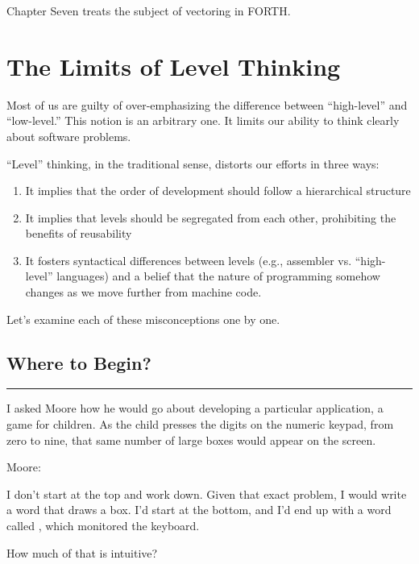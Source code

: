 Chapter Seven treats the subject of vectoring in FORTH.

\section{The Limits of Level Thinking}

Most of us are guilty of over-emphasizing the difference between
``high-level'' and ``low-level.'' This notion is an arbitrary one. It
limits our ability to think clearly about software problems.

``Level'' thinking, in the traditional sense, distorts our efforts in
three ways:

\begin{enumerate}
	\item It implies that the order of development should follow a hierarchical structure

	\item It implies that levels should be segregated from each other, prohibiting the
benefits of reusability

	\item It fosters syntactical differences between levels (e.g., assembler vs. ``high-level''
languages) and a belief that the nature of programming somehow
changes as we move further from machine code.
\end{enumerate}

Let's examine each of these misconceptions one by one.

\pagebreak\subsection{Where to Begin?}

\hrule height 1pt\vspace{2ex}

I asked Moore how he would go about developing a particular
application, a game for children. As the child presses the digits on
the numeric keypad, from zero to nine, that same number of large boxes
would appear on the screen.

	Moore:

\begin{tfquot}
	I don't start at the top and work down. Given that exact problem, I would
	write a word that draws a box. I'd start at the bottom, and I'd end up with a
	word called , which monitored the keyboard.
\end{tfquot}


\noindent How much of that is intuitive?

